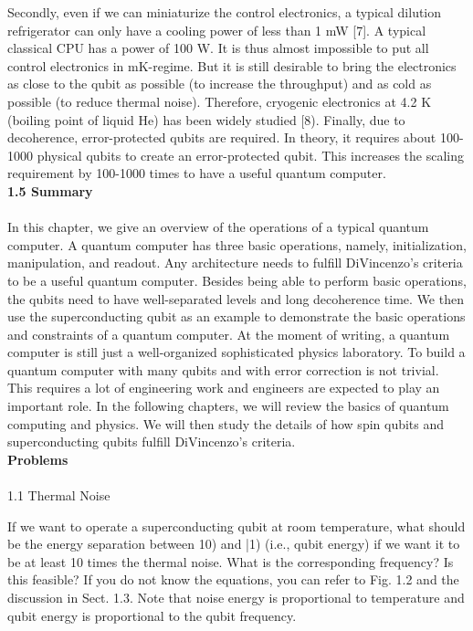 \documentclass{article}
\begin{document}
Secondly, even if we can miniaturize the control electronics, a typical dilution refrigerator can only have a cooling power of less than 1 mW [7]. A typical classical CPU has a power of 100 W. It is thus almost impossible to put all control electronics in mK-regime. But it is still desirable to bring the electronics as close to the qubit as possible (to increase the throughput) and as cold as possible (to reduce thermal noise). Therefore, cryogenic electronics at 4.2 K (boiling point of liquid He) has been widely studied [8).
Finally, due to decoherence, error-protected qubits are required. In theory, it requires about 100-1000 physical qubits to create an error-protected qubit. This increases the scaling requirement by 100-1000 times to have a useful quantum computer.
\\[20pt]
\textbf{\large 1.5 Summary}
\\\\
In this chapter, we give an overview of the operations of a typical quantum computer. A quantum computer has three basic operations, namely, initialization, manipulation, and readout. Any architecture needs to fulfill DiVincenzo's criteria to be a useful quantum computer. Besides being able to perform basic operations, the qubits need to have well-separated levels and long decoherence time. We then use the superconducting qubit as an example to demonstrate the basic operations and constraints of a quantum computer. At the moment of writing, a quantum computer is still just a well-organized sophisticated physics laboratory. To build a quantum computer with many qubits and with error correction is not trivial. This requires a lot of engineering work and engineers are expected to play an important role. In the following chapters, we will review the basics of quantum computing and physics.
We will then study the details of how spin qubits and superconducting qubits fulfill
DiVincenzo's criteria.
\\[20pt]
\textbf{\large Problems}
\\\\
1.1 Thermal Noise

If we want to operate a superconducting qubit at room temperature, what should be the energy separation between 10) and |1) (i.e., qubit energy) if we want it to be at least 10 times the thermal noise. What is the corresponding frequency? Is this feasible? If you do not know the equations, you can refer to Fig. 1.2 and the discussion in Sect. 1.3. Note that noise energy is proportional to temperature and qubit energy is proportional to the qubit frequency.
\end{document}
